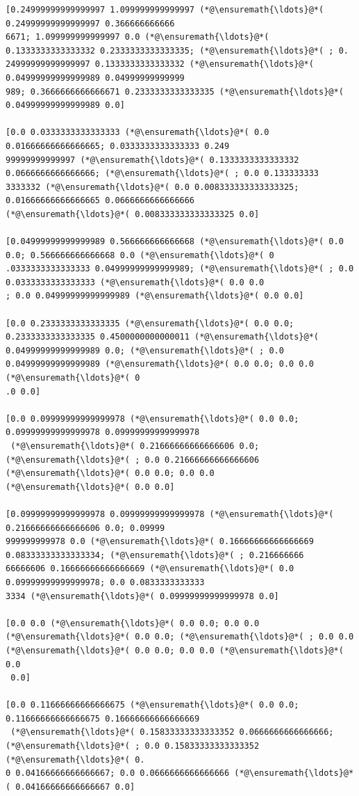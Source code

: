 \documentclass[12pt,a4paper]{article}
\begin{document}
\begin{lstlisting}
[0.24999999999999997 1.099999999999997 (*@\ensuremath{\ldots}@*( 0.24999999999999997 0.366666666666
6671; 1.099999999999997 0.0 (*@\ensuremath{\ldots}@*( 0.1333333333333332 0.2333333333333335; (*@\ensuremath{\ldots}@*( ; 0.
24999999999999997 0.1333333333333332 (*@\ensuremath{\ldots}@*( 0.04999999999999989 0.04999999999999
989; 0.3666666666666671 0.2333333333333335 (*@\ensuremath{\ldots}@*( 0.04999999999999989 0.0]

[0.0 0.0333333333333333 (*@\ensuremath{\ldots}@*( 0.0 0.01666666666666665; 0.0333333333333333 0.249
99999999999997 (*@\ensuremath{\ldots}@*( 0.1333333333333332 0.0666666666666666; (*@\ensuremath{\ldots}@*( ; 0.0 0.133333333
3333332 (*@\ensuremath{\ldots}@*( 0.0 0.008333333333333325; 0.01666666666666665 0.0666666666666666 
(*@\ensuremath{\ldots}@*( 0.008333333333333325 0.0]

[0.04999999999999989 0.566666666666668 (*@\ensuremath{\ldots}@*( 0.0 0.0; 0.566666666666668 0.0 (*@\ensuremath{\ldots}@*( 0
.0333333333333333 0.04999999999999989; (*@\ensuremath{\ldots}@*( ; 0.0 0.0333333333333333 (*@\ensuremath{\ldots}@*( 0.0 0.0
; 0.0 0.04999999999999989 (*@\ensuremath{\ldots}@*( 0.0 0.0]

[0.0 0.2333333333333335 (*@\ensuremath{\ldots}@*( 0.0 0.0; 0.2333333333333335 0.4500000000000011 (*@\ensuremath{\ldots}@*( 
0.04999999999999989 0.0; (*@\ensuremath{\ldots}@*( ; 0.0 0.04999999999999989 (*@\ensuremath{\ldots}@*( 0.0 0.0; 0.0 0.0 (*@\ensuremath{\ldots}@*( 0
.0 0.0]

[0.0 0.09999999999999978 (*@\ensuremath{\ldots}@*( 0.0 0.0; 0.09999999999999978 0.09999999999999978
 (*@\ensuremath{\ldots}@*( 0.21666666666666606 0.0; (*@\ensuremath{\ldots}@*( ; 0.0 0.21666666666666606 (*@\ensuremath{\ldots}@*( 0.0 0.0; 0.0 0.0 
(*@\ensuremath{\ldots}@*( 0.0 0.0]

[0.09999999999999978 0.09999999999999978 (*@\ensuremath{\ldots}@*( 0.21666666666666606 0.0; 0.09999
999999999978 0.0 (*@\ensuremath{\ldots}@*( 0.16666666666666669 0.08333333333333334; (*@\ensuremath{\ldots}@*( ; 0.216666666
66666606 0.16666666666666669 (*@\ensuremath{\ldots}@*( 0.0 0.09999999999999978; 0.0 0.0833333333333
3334 (*@\ensuremath{\ldots}@*( 0.09999999999999978 0.0]

[0.0 0.0 (*@\ensuremath{\ldots}@*( 0.0 0.0; 0.0 0.0 (*@\ensuremath{\ldots}@*( 0.0 0.0; (*@\ensuremath{\ldots}@*( ; 0.0 0.0 (*@\ensuremath{\ldots}@*( 0.0 0.0; 0.0 0.0 (*@\ensuremath{\ldots}@*( 0.0
 0.0]

[0.0 0.11666666666666675 (*@\ensuremath{\ldots}@*( 0.0 0.0; 0.11666666666666675 0.16666666666666669
 (*@\ensuremath{\ldots}@*( 0.15833333333333352 0.0666666666666666; (*@\ensuremath{\ldots}@*( ; 0.0 0.15833333333333352 (*@\ensuremath{\ldots}@*( 0.
0 0.04166666666666667; 0.0 0.0666666666666666 (*@\ensuremath{\ldots}@*( 0.04166666666666667 0.0]


\end{lstlisting}
\end{document}
